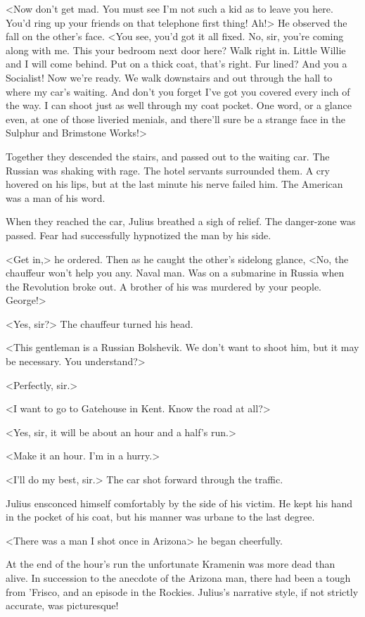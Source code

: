 <Now don't get mad. You must see I'm not such a kid as to leave you here. You'd ring up your friends on that telephone first thing! Ah!> He observed the fall on the other's face. <You see, you'd got it all fixed. No, sir, you're coming along with me. This your bedroom next door here? Walk right in. Little Willie and I will come behind. Put on a thick coat, that's right. Fur lined? And you a Socialist! Now we're ready. We walk downstairs and out through the hall to where my car's waiting. And don't you forget I've got you covered every inch of the way. I can shoot just as well through my coat pocket. One word, or a glance even, at one of those liveried menials, and there'll sure be a strange face in the Sulphur and Brimstone Works!>

Together they descended the stairs, and passed out to the waiting car. The Russian was shaking with rage. The hotel servants surrounded them. A cry hovered on his lips, but at the last minute his nerve failed him. The American was a man of his word.

When they reached the car, Julius breathed a sigh of relief. The danger-zone was passed. Fear had successfully hypnotized the man by his side.

<Get in,> he ordered. Then as he caught the other's sidelong glance, <No, the chauffeur won't help you any. Naval man. Was on a submarine in Russia when the Revolution broke out. A brother of his was murdered by your people. George!>

<Yes, sir?> The chauffeur turned his head.

<This gentleman is a Russian Bolshevik. We don't want to shoot him, but it may be necessary. You understand?>

<Perfectly, sir.>

<I want to go to Gatehouse in Kent. Know the road at all?>

<Yes, sir, it will be about an hour and a half's run.>

<Make it an hour. I'm in a hurry.>

<I'll do my best, sir.> The car shot forward through the traffic.

Julius ensconced himself comfortably by the side of his victim. He kept his hand in the pocket of his coat, but his manner was urbane to the last degree.

<There was a man I shot once in Arizona\longdash> he began cheerfully.

At the end of the hour's run the unfortunate Kramenin was more dead than alive. In succession to the anecdote of the Arizona man, there had been a tough from 'Frisco, and an episode in the Rockies. Julius's narrative style, if not strictly accurate, was picturesque!

